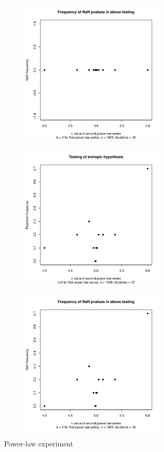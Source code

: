 \begin{figure}[hbt]
\begin{subfigure}[b]{0.3\textwidth}
    \end{subfigure}
    \hfill
    \begin{subfigure}[b]{0.5\textwidth}
        \centering
        \includegraphics[height=7cm,keepaspectratio]{./powerlaw/NaNPlot,k1=3,n=1000,iterations=10.pdf}
    \end{subfigure}
    \vfill
    \begin{subfigure}[b]{0.3\textwidth}
        \centering
        \includegraphics[height=7cm,keepaspectratio]{./powerlaw/rejectionPlot,k1=5,n=1000,iterations=10.pdf}
    \end{subfigure}
    \hfill
    \begin{subfigure}[b]{0.5\textwidth}
        \centering
        \includegraphics[height=7cm,keepaspectratio]{./powerlaw/NaNPlot,k1=5,n=1000,iterations=10.pdf}
    \end{subfigure}
    \caption{Power-law experiment}\label{fig:PowerLawTests}
\end{figure}

